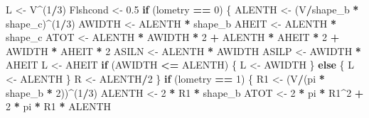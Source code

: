 \documentclass[]{article}
\newenvironment{Shaded}{\begin{snugshade}}{\end{snugshade}}
\newcommand{\DecValTok}[1]{\textcolor[rgb]{0.00,0.00,0.81}{#1}}
\newcommand{\FloatTok}[1]{\textcolor[rgb]{0.00,0.00,0.81}{#1}}
\newcommand{\StringTok}[1]{\textcolor[rgb]{0.31,0.60,0.02}{#1}}
\newcommand{\ControlFlowTok}[1]{\textcolor[rgb]{0.13,0.29,0.53}{\textbf{#1}}}
\newcommand{\OperatorTok}[1]{\textcolor[rgb]{0.81,0.36,0.00}{\textbf{#1}}}
\newcommand{\NormalTok}[1]{#1}
\begin{document}
\begin{Shaded}
\begin{Highlighting}[]
\NormalTok{    L <-}\StringTok{ }\NormalTok{V}\OperatorTok{^}\NormalTok{(}\DecValTok{1}\OperatorTok{/}\DecValTok{3}\NormalTok{)}
\NormalTok{    Flshcond <-}\StringTok{ }\FloatTok{0.5}
    \ControlFlowTok{if}\NormalTok{ (lometry }\OperatorTok{==}\StringTok{ }\DecValTok{0}\NormalTok{) \{}
\NormalTok{        ALENTH <-}\StringTok{ }\NormalTok{(V}\OperatorTok{/}\NormalTok{shape_b }\OperatorTok{*}\StringTok{ }\NormalTok{shape_c)}\OperatorTok{^}\NormalTok{(}\DecValTok{1}\OperatorTok{/}\DecValTok{3}\NormalTok{)}
\NormalTok{        AWIDTH <-}\StringTok{ }\NormalTok{ALENTH }\OperatorTok{*}\StringTok{ }\NormalTok{shape_b}
\NormalTok{        AHEIT <-}\StringTok{ }\NormalTok{ALENTH }\OperatorTok{*}\StringTok{ }\NormalTok{shape_c}
\NormalTok{        ATOT <-}\StringTok{ }\NormalTok{ALENTH }\OperatorTok{*}\StringTok{ }\NormalTok{AWIDTH }\OperatorTok{*}\StringTok{ }\DecValTok{2} \OperatorTok{+}\StringTok{ }\NormalTok{ALENTH }\OperatorTok{*}\StringTok{ }\NormalTok{AHEIT }\OperatorTok{*}\StringTok{ }\DecValTok{2} \OperatorTok{+}\StringTok{ }\NormalTok{AWIDTH }\OperatorTok{*}\StringTok{ }
\StringTok{            }\NormalTok{AHEIT }\OperatorTok{*}\StringTok{ }\DecValTok{2}
\NormalTok{        ASILN <-}\StringTok{ }\NormalTok{ALENTH }\OperatorTok{*}\StringTok{ }\NormalTok{AWIDTH}
\NormalTok{        ASILP <-}\StringTok{ }\NormalTok{AWIDTH }\OperatorTok{*}\StringTok{ }\NormalTok{AHEIT}
\NormalTok{        L <-}\StringTok{ }\NormalTok{AHEIT}
        \ControlFlowTok{if}\NormalTok{ (AWIDTH }\OperatorTok{<=}\StringTok{ }\NormalTok{ALENTH) \{}
\NormalTok{            L <-}\StringTok{ }\NormalTok{AWIDTH}
\NormalTok{        \}}
        \ControlFlowTok{else}\NormalTok{ \{}
\NormalTok{            L <-}\StringTok{ }\NormalTok{ALENTH}
\NormalTok{        \}}
\NormalTok{        R <-}\StringTok{ }\NormalTok{ALENTH}\OperatorTok{/}\DecValTok{2}
\NormalTok{    \}}
    \ControlFlowTok{if}\NormalTok{ (lometry }\OperatorTok{==}\StringTok{ }\DecValTok{1}\NormalTok{) \{}
\NormalTok{        R1 <-}\StringTok{ }\NormalTok{(V}\OperatorTok{/}\NormalTok{(pi }\OperatorTok{*}\StringTok{ }\NormalTok{shape_b }\OperatorTok{*}\StringTok{ }\DecValTok{2}\NormalTok{))}\OperatorTok{^}\NormalTok{(}\DecValTok{1}\OperatorTok{/}\DecValTok{3}\NormalTok{)}
\NormalTok{        ALENTH <-}\StringTok{ }\DecValTok{2} \OperatorTok{*}\StringTok{ }\NormalTok{R1 }\OperatorTok{*}\StringTok{ }\NormalTok{shape_b}
\NormalTok{        ATOT <-}\StringTok{ }\DecValTok{2} \OperatorTok{*}\StringTok{ }\NormalTok{pi }\OperatorTok{*}\StringTok{ }\NormalTok{R1}\OperatorTok{^}\DecValTok{2} \OperatorTok{+}\StringTok{ }\DecValTok{2} \OperatorTok{*}\StringTok{ }\NormalTok{pi }\OperatorTok{*}\StringTok{ }\NormalTok{R1 }\OperatorTok{*}\StringTok{ }\NormalTok{ALENTH}

\end{Highlighting}
\end{Shaded}
\end{document}

